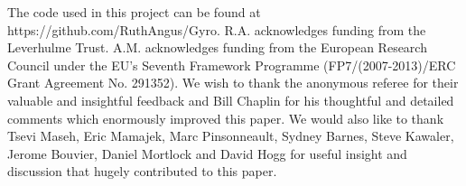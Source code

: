 \documentclass[useAMS, usenatbib]{mn2e}
\begin{document}
The code used in this project can be found at
https://github.com/RuthAngus/Gyro.
R.A. acknowledges funding from the Leverhulme Trust.
A.M. acknowledges funding from the European Research Council under the EU’s
Seventh Framework Programme (FP7/(2007-2013)/ERC Grant Agreement No. 291352).
We wish to thank the anonymous referee for their valuable and insightful
feedback and Bill Chaplin for his thoughtful and detailed comments
which enormously improved this paper.
We would also like to thank Tsevi Maseh, Eric Mamajek, Marc Pinsonneault,
Sydney Barnes, Steve Kawaler, Jerome Bouvier, Daniel Mortlock and David Hogg
for useful insight and discussion that hugely contributed to this paper.



\end{document}
